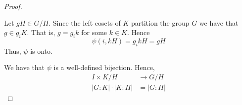 \begin{proof}
\begin{description}
        Let $gH \in G/H$. Since the left cosets of $K$ partition the group $G$ we have that $g \in g_i K$. That is, $g=g_ik$ for some $k \in K$. Hence 
        $$\psi(i, kH) = g_ikH = gH$$
        Thus, $\psi$ is onto.
    \end{description}

    We have that $\psi$ is a well-defined bijection. Hence, 
    \begin{align*}
        I \times K/H &\to G/H \\
        |G:K| \cdot |K:H| &= |G:H|
    \end{align*}
\end{proof}